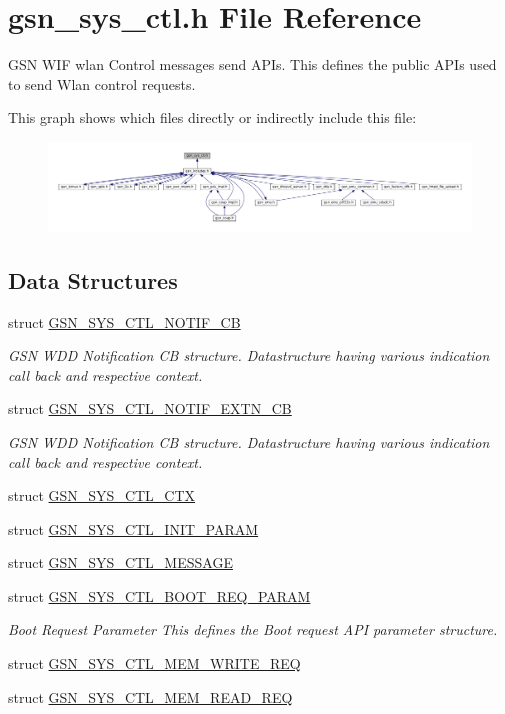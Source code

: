 \hypertarget{a00592}{
\section{gsn\_\-sys\_\-ctl.h File Reference}
\label{a00592}
}


GSN WIF wlan Control messages send APIs. This defines the public APIs used to send Wlan control requests.  


This graph shows which files directly or indirectly include this file:
\nopagebreak
\begin{figure}[H]
\begin{center}
\leavevmode
\includegraphics[width=400pt]{a00836}
\end{center}
\end{figure}
\subsection*{Data Structures}
\begin{DoxyCompactItemize}
\item 
struct \hyperlink{a00253}{GSN\_\-SYS\_\-CTL\_\-NOTIF\_\-CB}
\begin{DoxyCompactList}\small\item\em GSN WDD Notification CB structure. Datastructure having various indication call back and respective context. \end{DoxyCompactList}\item 
struct \hyperlink{a00254}{GSN\_\-SYS\_\-CTL\_\-NOTIF\_\-EXTN\_\-CB}
\begin{DoxyCompactList}\small\item\em GSN WDD Notification CB structure. Datastructure having various indication call back and respective context. \end{DoxyCompactList}\item 
struct \hyperlink{a00248}{GSN\_\-SYS\_\-CTL\_\-CTX}
\item 
struct \hyperlink{a00249}{GSN\_\-SYS\_\-CTL\_\-INIT\_\-PARAM}
\item 
struct \hyperlink{a00252}{GSN\_\-SYS\_\-CTL\_\-MESSAGE}
\item 
struct \hyperlink{a00247}{GSN\_\-SYS\_\-CTL\_\-BOOT\_\-REQ\_\-PARAM}
\begin{DoxyCompactList}\small\item\em Boot Request Parameter This defines the Boot request API parameter structure. \end{DoxyCompactList}\item 
struct \hyperlink{a00251}{GSN\_\-SYS\_\-CTL\_\-MEM\_\-WRITE\_\-REQ}
\item 
struct \hyperlink{a00250}{GSN\_\-SYS\_\-CTL\_\-MEM\_\-READ\_\-REQ}
\end{DoxyCompactItemize}
